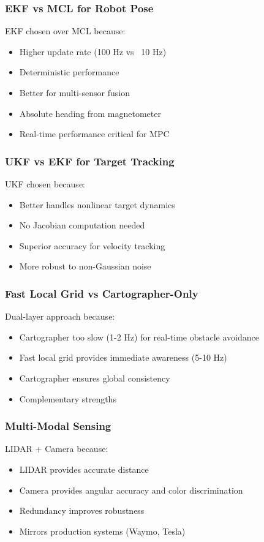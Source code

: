 \documentclass[11pt,a4paper]{article}
\begin{document}
\subsubsection{EKF vs MCL for Robot Pose}
EKF chosen over MCL because:
\begin{itemize}
    \item Higher update rate (100 Hz vs ~10 Hz)
    \item Deterministic performance
    \item Better for multi-sensor fusion
    \item Absolute heading from magnetometer
    \item Real-time performance critical for MPC
\end{itemize}

\subsubsection{UKF vs EKF for Target Tracking}
UKF chosen because:
\begin{itemize}
    \item Better handles nonlinear target dynamics
    \item No Jacobian computation needed
    \item Superior accuracy for velocity tracking
    \item More robust to non-Gaussian noise
\end{itemize}

\subsubsection{Fast Local Grid vs Cartographer-Only}
Dual-layer approach because:
\begin{itemize}
    \item Cartographer too slow (1-2 Hz) for real-time obstacle avoidance
    \item Fast local grid provides immediate awareness (5-10 Hz)
    \item Cartographer ensures global consistency
    \item Complementary strengths
\end{itemize}

\subsubsection{Multi-Modal Sensing}
LIDAR + Camera because:
\begin{itemize}
    \item LIDAR provides accurate distance
    \item Camera provides angular accuracy and color discrimination
    \item Redundancy improves robustness
    \item Mirrors production systems (Waymo, Tesla)
\end{itemize}
\end{document}
